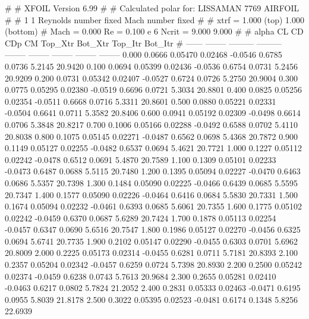 #  
#       XFOIL         Version 6.99
#  
# Calculated polar for: LISSAMAN 7769 AIRFOIL                           
#  
# 1 1 Reynolds number fixed          Mach number fixed         
#  
# xtrf =   1.000 (top)        1.000 (bottom)  
# Mach =   0.000     Re =     0.100 e 6     Ncrit =   9.000  9.000
#  
#   alpha    CL        CD       CDp       CM     Top_Xtr  Bot_Xtr  Top_Itr  Bot_Itr
#  ------ -------- --------- --------- -------- -------- -------- -------- --------
   0.000   0.0666   0.05470   0.02468  -0.0546   0.6785   0.0736   5.2145  20.9420
   0.100   0.0694   0.05399   0.02436  -0.0536   0.6754   0.0731   5.2456  20.9209
   0.200   0.0731   0.05342   0.02407  -0.0527   0.6724   0.0726   5.2750  20.9004
   0.300   0.0775   0.05295   0.02380  -0.0519   0.6696   0.0721   5.3034  20.8801
   0.400   0.0825   0.05256   0.02354  -0.0511   0.6668   0.0716   5.3311  20.8601
   0.500   0.0880   0.05221   0.02331  -0.0504   0.6641   0.0711   5.3582  20.8406
   0.600   0.0941   0.05192   0.02309  -0.0498   0.6614   0.0706   5.3848  20.8217
   0.700   0.1006   0.05166   0.02288  -0.0492   0.6588   0.0702   5.4110  20.8038
   0.800   0.1075   0.05145   0.02271  -0.0487   0.6562   0.0698   5.4368  20.7872
   0.900   0.1149   0.05127   0.02255  -0.0482   0.6537   0.0694   5.4621  20.7721
   1.000   0.1227   0.05112   0.02242  -0.0478   0.6512   0.0691   5.4870  20.7589
   1.100   0.1309   0.05101   0.02233  -0.0473   0.6487   0.0688   5.5115  20.7480
   1.200   0.1395   0.05094   0.02227  -0.0470   0.6463   0.0686   5.5357  20.7398
   1.300   0.1484   0.05090   0.02225  -0.0466   0.6439   0.0685   5.5595  20.7347
   1.400   0.1577   0.05090   0.02226  -0.0464   0.6416   0.0684   5.5830  20.7331
   1.500   0.1674   0.05094   0.02232  -0.0461   0.6393   0.0685   5.6061  20.7355
   1.600   0.1775   0.05102   0.02242  -0.0459   0.6370   0.0687   5.6289  20.7424
   1.700   0.1878   0.05113   0.02254  -0.0457   0.6347   0.0690   5.6516  20.7547
   1.800   0.1986   0.05127   0.02270  -0.0456   0.6325   0.0694   5.6741  20.7735
   1.900   0.2102   0.05147   0.02290  -0.0455   0.6303   0.0701   5.6962  20.8009
   2.000   0.2225   0.05173   0.02314  -0.0455   0.6281   0.0711   5.7181  20.8393
   2.100   0.2357   0.05204   0.02342  -0.0457   0.6259   0.0724   5.7398  20.8930
   2.200   0.2500   0.05242   0.02374  -0.0459   0.6238   0.0743   5.7613  20.9684
   2.300   0.2655   0.05281   0.02410  -0.0463   0.6217   0.0802   5.7824  21.2052
   2.400   0.2831   0.05333   0.02463  -0.0471   0.6195   0.0955   5.8039  21.8178
   2.500   0.3022   0.05395   0.02523  -0.0481   0.6174   0.1348   5.8256  22.6939
